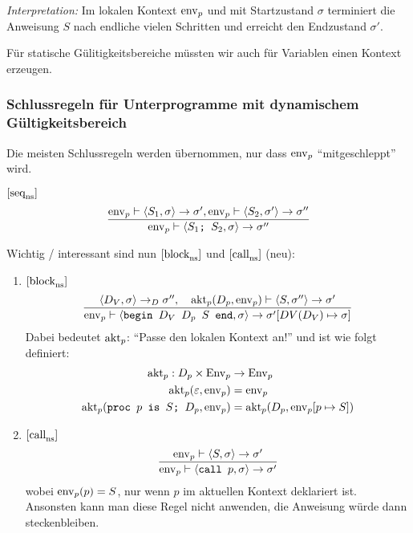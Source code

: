 \emph{Interpretation:} Im lokalen Kontext $\operatorname{env}_p$ und mit Startzustand $\sigma$ terminiert die Anweisung $S$ nach endliche vielen Schritten und erreicht den Endzustand $\sigma'$.

\par\medskip
\begin{remark}
    Für statische Gülitigkeitsbereiche müssten wir auch für Variablen einen Kontext erzeugen.
\end{remark}




\subsubsection{Schlussregeln für Unterprogramme mit dynamischem Gültigkeitsbereich}

Die meisten Schlussregeln werden übernommen, nur dass $\operatorname{env}_p$ ``mitgeschleppt'' wird.

\begin{example}
    $[\text{seq}_{\text{ns}}^{}]$ \begin{align*}
        \frac{
        \operatorname{env}_p \vdash \langle S_1, \sigma \rangle \to \sigma', \operatorname{env}_p \vdash \langle S_2, \sigma' \rangle \to \sigma''
        }{
            \operatorname{env}_p \vdash \langle \texttt{$S_1$; $S_2$}, \sigma \rangle \to \sigma''
        }
    \end{align*}
\end{example}

Wichtig / interessant sind nun $[\text{block}_{\text{ns}}^{}]$ und $[\text{call}_{\text{ns}}^{}]$ (neu):
\begin{enumerate}
    \item $[\text{block}_{\text{ns}}^{}]$ \begin{align*}
        \frac{
            \langle D_V, \sigma \rangle \to_D \sigma'',
            \quad
            \operatorname{akt}_p(D_p, \operatorname{env}_p) \vdash \langle S, \sigma'' \rangle \to \sigma'
        }{
            \operatorname{env}_p \vdash \langle \texttt{begin $D_V$ $D_p$ $S$ end}, \sigma \rangle \to \sigma'[DV(D_V) \mapsto \sigma]
        }
    \end{align*}
    Dabei bedeutet $\operatorname{akt}_p$: ``Passe den lokalen Kontext an!'' und ist wie folgt definiert:
    \begin{align*}
        \operatorname{akt}_p: D_p \times \operatorname{Env}_p & \to \operatorname{Env}_p \\
        \operatorname{akt}_p(\varepsilon, \operatorname{env}_p) & = \operatorname{env}_p \\
        \operatorname{akt}_p(\texttt{proc $p$ is $S$; $D_p$}, \operatorname{env}_p) & = \operatorname{akt}_p(D_p, \operatorname{env}_p[p \mapsto S])
    \end{align*}

    \item $[\text{call}_{\text{ns}}^{}]$ \begin{align*}
        \frac{
            \operatorname{env}_p \vdash \langle S, \sigma \rangle \to \sigma'
        }{
            \operatorname{env}_p \vdash \langle \texttt{call $p$}, \sigma \rangle \to \sigma'
        }
    \end{align*}
    wobei $\operatorname{env}_p(p) = S$, \dh{} nur wenn $p$ im aktuellen Kontext deklariert ist. Ansonsten kann man diese Regel nicht anwenden, \dh{} die Anweisung würde dann steckenbleiben.
\end{enumerate}

